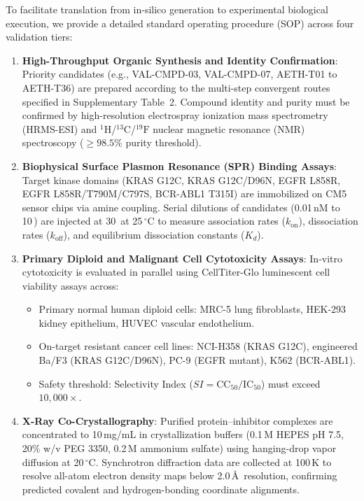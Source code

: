 \documentclass[11pt,a4paper]{article}
\begin{document}
To facilitate translation from in-silico generation to experimental biological execution, we provide a detailed standard operating procedure (SOP) across four validation tiers:

\begin{enumerate}
    \item \textbf{High-Throughput Organic Synthesis and Identity Confirmation}:
    Priority candidates (e.g., VAL-CMPD-03, VAL-CMPD-07, AETH-T01 to AETH-T36) are prepared according to the multi-step convergent routes specified in Supplementary Table~2. Compound identity and purity must be confirmed by high-resolution electrospray ionization mass spectrometry (HRMS-ESI) and $^1\text{H}$/$^{13}\text{C}$/$^{19}\text{F}$ nuclear magnetic resonance (NMR) spectroscopy ($\ge 98.5\%$ purity threshold).
    \item \textbf{Biophysical Surface Plasmon Resonance (SPR) Binding Assays}:
    Target kinase domains (KRAS G12C, KRAS G12C/D96N, EGFR L858R, EGFR L858R/T790M/C797S, BCR-ABL1 T315I) are immobilized on CM5 sensor chips via amine coupling. Serial dilutions of candidates (0.01\,nM to 10\,\mu{}) are injected at 30\,\mu{} at 25\,$^\circ$C to measure association rates ($k_{\text{on}}$), dissociation rates ($k_{\text{off}}$), and equilibrium dissociation constants ($K_d$).
    \item \textbf{Primary Diploid and Malignant Cell Cytotoxicity Assays}:
    In-vitro cytotoxicity is evaluated in parallel using CellTiter-Glo luminescent cell viability assays across:
    \begin{itemize}
        \item Primary normal human diploid cells: MRC-5 lung fibroblasts, HEK-293 kidney epithelium, HUVEC vascular endothelium.
        \item On-target resistant cancer cell lines: NCI-H358 (KRAS G12C), engineered Ba/F3 (KRAS G12C/D96N), PC-9 (EGFR mutant), K562 (BCR-ABL1).
        \item Safety threshold: Selectivity Index ($SI = \text{CC}_{50}/\text{IC}_{50}$) must exceed $10,000\times$.
    \end{itemize}
    \item \textbf{X-Ray Co-Crystallography}:
    Purified protein--inhibitor complexes are concentrated to 10\,mg/mL in crystallization buffers (0.1\,M HEPES pH 7.5, 20\% w/v PEG 3350, 0.2\,M ammonium sulfate) using hanging-drop vapor diffusion at 20\,$^\circ$C. Synchrotron diffraction data are collected at 100\,K to resolve all-atom electron density maps below 2.0\,\AA\ resolution, confirming predicted covalent and hydrogen-bonding coordinate alignments.
\end{enumerate}
\end{document}

